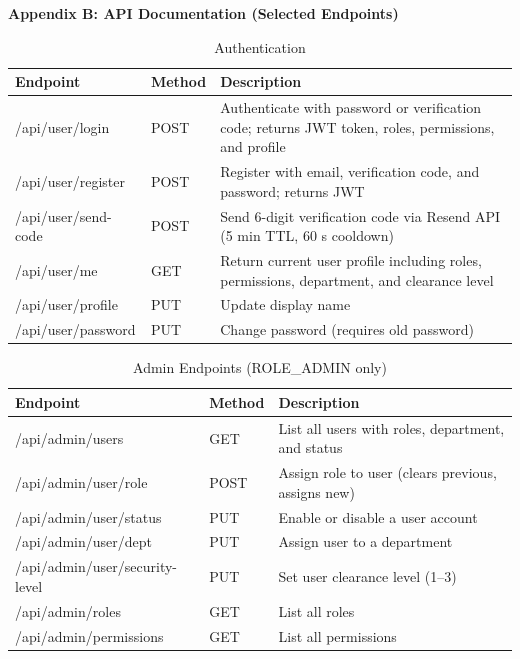 \newpage
{}
\begin{center}
{\fontsize{16}{19}\selectfont\textbf{Appendix B: API Documentation (Selected Endpoints)}}
\end{center}

\vspace{3mm}


\begin{table}[H]
\small\singlespacing
\centering
\caption{Authentication}
\label{tab:api-auth}
\begin{tabularx}{\textwidth}{>{\RaggedRight\arraybackslash}p{}>{\RaggedRight\arraybackslash}p{1.3cm}>{\RaggedRight\arraybackslash}X}
\toprule
\textbf{Endpoint} & \textbf{Method} & \textbf{Description} \\
\midrule
/api/user/login & POST & Authenticate with password or verification code; returns JWT token, roles, permissions, and profile \\
/api/user/register & POST & Register with email, verification code, and password; returns JWT \\
/api/user/send-code & POST & Send 6-digit verification code via Resend API (5 min TTL, 60 s cooldown) \\
/api/user/me & GET & Return current user profile including roles, permissions, department, and clearance level \\
/api/user/profile & PUT & Update display name \\
/api/user/password & PUT & Change password (requires old password) \\
\bottomrule
\end{tabularx}
\end{table}

\begin{table}[H]
\small\singlespacing
\centering
\caption{Admin Endpoints (ROLE\_ADMIN only)}
\label{tab:api-admin}
\begin{tabularx}{\textwidth}{>{\RaggedRight\arraybackslash}p{}>{\RaggedRight\arraybackslash}p{1.3cm}>{\RaggedRight\arraybackslash}X}
\toprule
\textbf{Endpoint} & \textbf{Method} & \textbf{Description} \\
\midrule
/api/admin/users & GET & List all users with roles, department, and status \\
/api/admin/user/role & POST & Assign role to user (clears previous, assigns new) \\
/api/admin/user/status & PUT & Enable or disable a user account \\
/api/admin/user/dept & PUT & Assign user to a department \\
/api/admin/user/security-level & PUT & Set user clearance level (1--3) \\
/api/admin/roles & GET & List all roles \\
/api/admin/permissions & GET & List all permissions \\
\bottomrule
\end{tabularx}
\end{table}

